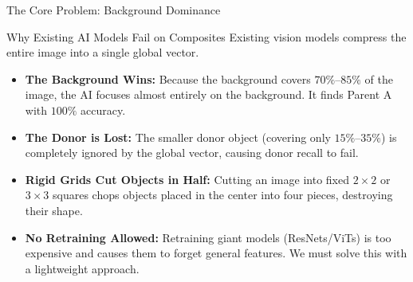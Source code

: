 \documentclass[xcolor=table]{beamer}
\begin{document}
\begin{frame}{The Core Problem: Background Dominance}
  \begin{block}{Why Existing AI Models Fail on Composites}
    Existing vision models compress the entire image into a single global vector.
  \end{block}
  \vspace{0.2cm}
  \begin{itemize}
    \item \textbf{The Background Wins:} Because the background covers $70\%\text{--}85\%$ of the image, the AI focuses almost entirely on the background. It finds Parent A with $100\%$ accuracy.
    \item \textbf{The Donor is Lost:} The smaller donor object (covering only $15\%\text{--}35\%$) is completely ignored by the global vector, causing donor recall to fail.
    \item \textbf{Rigid Grids Cut Objects in Half:} Cutting an image into fixed $2\times2$ or $3\times3$ squares chops objects placed in the center into four pieces, destroying their shape.
    \item \textbf{No Retraining Allowed:} Retraining giant models (ResNets/ViTs) is too expensive and causes them to forget general features. We must solve this with a lightweight approach.
  \end{itemize}
\end{frame}
\end{document}
